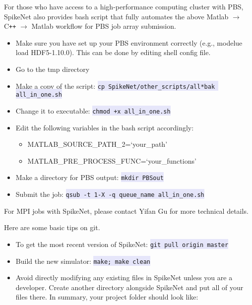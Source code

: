 \documentclass{article}
\newcommand{\mylstinline}[1] {\colorbox{Lavender}{\lstinline[basicstyle=\ttfamily\footnotesize\color{Black}]|#1|} }
\begin{document}
For those who have access to a high-performance computing cluster with PBS, SpikeNet also provides bash script that fully automates the above Matlab $\rightarrow$  C\texttt{++}  $\rightarrow$ Matlab workflow for PBS job array submission. 
\begin{itemize}
\item Make sure you have set up your PBS environment correctly (e.g., modelue load HDF5-1.10.0). This can be done by editing shell config file.
\item Go to the tmp directory
\item Make a copy of the script: \mylstinline{cp SpikeNet/other_scripts/all*bak all_in_one.sh}
\item Change it to executable: \mylstinline{chmod +x all_in_one.sh}
\item Edit the following variables in the bash script accordingly: 
\begin{itemize}
\item {\footnotesize MATLAB\_SOURCE\_PATH\_2=`your\_path'}
\item {\footnotesize MATLAB\_PRE\_PROCESS\_FUNC=`your\_functions'}
\end{itemize}
\item Make a directory for PBS output: \mylstinline{mkdir PBSout}
\item Submit the job: \mylstinline{qsub -t 1-X -q queue_name all_in_one.sh}
\end{itemize}

For MPI jobs with SpikeNet, please contact Yifan Gu for more technical details.

Here are some basic tips on git.
\begin{itemize}
\item To get the most recent version of SpikeNet: \mylstinline{git pull origin master}
\item Build the new simulator: \mylstinline{make; make clean}
\item Avoid directly modifying any existing files in SpikeNet unless you are a developer. Create another directory alongside SpikeNet and put all of your files there. In summary, your project folder should look like:
\end{itemize}
\hfill\begin{minipage}{\dimexpr\textwidth-1cm}
\xdef\tpd{\the\prevdepth}
\end{minipage}
\end{document}

